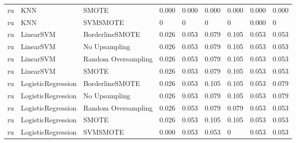 \begin{tabular}{lllllllll}
      ru &                          KNN &               SMOTE & 0.000 &                     0.000 &                 0.000 &                  0.000 &                                   0.000 &     0.000 \\
      ru &                          KNN &            SVMSMOTE &     0 &                         0 &                     0 &                      0 &                                   0.000 &         0 \\
      ru &                    LinearSVM &     BorderlineSMOTE & 0.026 &                     0.053 &                 0.079 &                  0.105 &                                   0.053 &     0.053 \\
      ru &                    LinearSVM &       No Upsampling & 0.026 &                     0.053 &                 0.079 &                  0.105 &                                   0.053 &     0.053 \\
      ru &                    LinearSVM & Random Oversampling & 0.026 &                     0.053 &                 0.079 &                  0.105 &                                   0.053 &     0.053 \\
      ru &                    LinearSVM &               SMOTE & 0.026 &                     0.053 &                 0.079 &                  0.105 &                                   0.053 &     0.053 \\
      ru &           LogisticRegression &     BorderlineSMOTE & 0.026 &                     0.053 &                 0.105 &                  0.105 &                                   0.053 &     0.079 \\
      ru &           LogisticRegression &       No Upsampling & 0.026 &                     0.053 &                 0.079 &                  0.105 &                                   0.053 &     0.079 \\
      ru &           LogisticRegression & Random Oversampling & 0.026 &                     0.053 &                 0.079 &                  0.079 &                                   0.053 &     0.053 \\
      ru &           LogisticRegression &               SMOTE & 0.026 &                     0.053 &                 0.105 &                  0.105 &                                   0.053 &     0.053 \\
      ru &           LogisticRegression &            SVMSMOTE & 0.000 &                     0.053 &                 0.053 &                      0 &                                   0.053 &     0.053 \\

\end{tabular}
